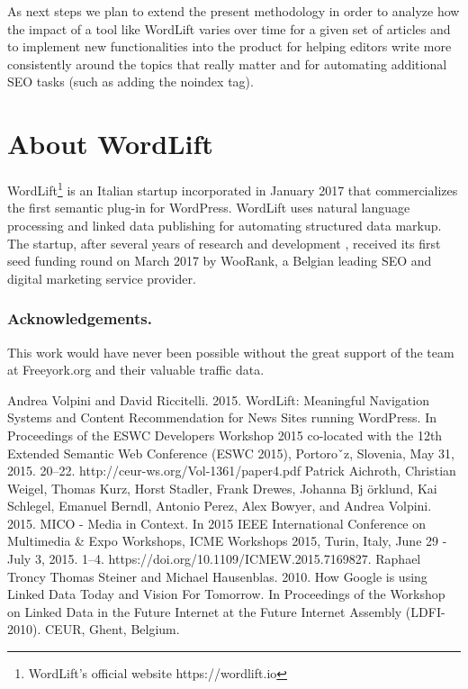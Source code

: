 \documentclass[runningheads,a4paper]{llncs}
\begin{document}
As next steps we plan to extend the present methodology in
 order to analyze how the impact of a tool like WordLift varies over
 time for a given set of articles and to implement new functionalities
 into the product for helping editors write more consistently around
 the topics that really matter and for automating additional SEO
 tasks (such as adding the noindex tag).

\section{About WordLift}

WordLift\footnote{WordLift's
 official website https://wordlift.io} is an Italian startup incorporated in January 2017 that
 commercializes the first semantic plug-in for WordPress. WordLift
 uses natural language processing and linked data publishing for
automating structured data markup. The startup, after several years
 of research and development  \cite{__RefHeading__452_683783752}, received its first seed funding
 round on March 2017 by WooRank, a Belgian leading SEO and
digital marketing service provider.

\subsubsection*{Acknowledgements.}This work would have never been possible without the great support
 of the team at Freeyork.org and their valuable traffic data.


\begin{thebibliography}{4}

 Andrea Volpini and David Riccitelli. 2015. WordLift: Meaningful Navigation
 Systems and Content Recommendation for News Sites running WordPress. In
 Proceedings of the ESWC Developers Workshop 2015 co-located with the 12th Extended Semantic Web Conference (ESWC 2015), Portoroˇz, Slovenia, May 31, 2015.
 20--22. http://ceur-ws.org/Vol-1361/paper4.pdf
 Patrick Aichroth, Christian Weigel, Thomas Kurz, Horst Stadler, Frank Drewes,
 Johanna Bj örklund, Kai Schlegel, Emanuel Berndl, Antonio Perez, Alex Bowyer,
 and Andrea Volpini. 2015. MICO - Media in Context. In 2015 IEEE International
 Conference on Multimedia \& Expo Workshops, ICME Workshops 2015, Turin, Italy,
 June 29 - July 3, 2015. 1--4. https://doi.org/10.1109/ICMEW.2015.7169827.
 Raphael Troncy Thomas Steiner and Michael Hausenblas. 2010. How Google
 is using Linked Data Today and Vision For Tomorrow. In Proceedings of the
 Workshop on Linked Data in the Future Internet at the Future Internet Assembly
 (LDFI-2010). CEUR, Ghent, Belgium.

\end{thebibliography}
\end{document}
